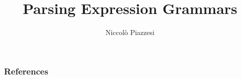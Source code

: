 \documentclass[aspectratio=169]{beamer}
\title{Parsing Expression Grammars}
\author{Niccolò Piazzesi}
\institute[UniPi]{
    Università degli Studi di Pisa \\
    Anno Accademico 2020-21 
}
\begin{document}
    \begin{frame}
        \maketitle
    \end{frame}
    
    
    
	


    \begin{frame}[allowframebreaks]
     
        \frametitle{References}
        
        
    \end{frame}
\end{document}
